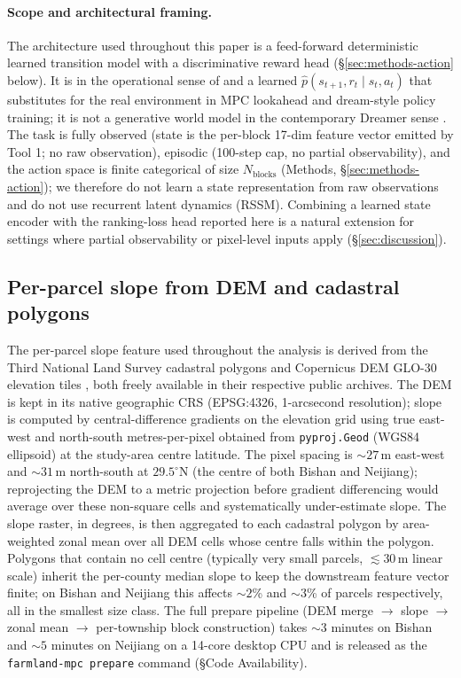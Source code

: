\documentclass[11pt]{article}
\begin{document}
\paragraph{Scope and architectural framing.} The architecture used throughout this paper is a feed-forward deterministic learned transition model with a discriminative reward head (\S\ref{sec:methods-action} below). It is in the operational sense of \citet{chua2018deep} and \citet{janner2019trust} a learned $\hat{p}(s_{t+1}, r_t \mid s_t, a_t)$ that substitutes for the real environment in MPC lookahead and dream-style policy training; it is not a generative world model in the contemporary Dreamer sense \citep{hafner2025dreamerv3,ha2018world}. The task is fully observed (state is the per-block 17-dim feature vector emitted by Tool 1; no raw observation), episodic (100-step cap, no partial observability), and the action space is finite categorical of size $N_{\text{blocks}}$ (Methods, \S\ref{sec:methods-action}); we therefore do not learn a state representation from raw observations and do not use recurrent latent dynamics (RSSM). Combining a learned state encoder with the ranking-loss head reported here is a natural extension for settings where partial observability or pixel-level inputs apply (\S\ref{sec:discussion}).

\subsection{Per-parcel slope from DEM and cadastral polygons}\label{sec:methods-prepare}

The per-parcel slope feature used throughout the analysis is derived from the Third National Land Survey cadastral polygons and Copernicus DEM GLO-30 elevation tiles \citep{copernicus2021dem}, both freely available in their respective public archives. The DEM is kept in its native geographic CRS (EPSG:4326, 1-arcsecond resolution); slope is computed by central-difference gradients on the elevation grid using true east-west and north-south metres-per-pixel obtained from \texttt{pyproj.Geod} (WGS84 ellipsoid) at the study-area centre latitude. The pixel spacing is $\sim$$27$\,m east-west and $\sim$$31$\,m north-south at $29.5^\circ$N (the centre of both Bishan and Neijiang); reprojecting the DEM to a metric projection before gradient differencing would average over these non-square cells and systematically under-estimate slope. The slope raster, in degrees, is then aggregated to each cadastral polygon by area-weighted zonal mean over all DEM cells whose centre falls within the polygon. Polygons that contain no cell centre (typically very small parcels, $\lesssim 30$\,m linear scale) inherit the per-county median slope to keep the downstream feature vector finite; on Bishan and Neijiang this affects $\sim$$2$\% and $\sim$$3$\% of parcels respectively, all in the smallest size class. The full prepare pipeline (DEM merge $\to$ slope $\to$ zonal mean $\to$ per-township block construction) takes $\sim$$3$ minutes on Bishan and $\sim$$5$ minutes on Neijiang on a 14-core desktop CPU and is released as the \texttt{farmland-mpc prepare} command (\S Code Availability).
\end{document}
